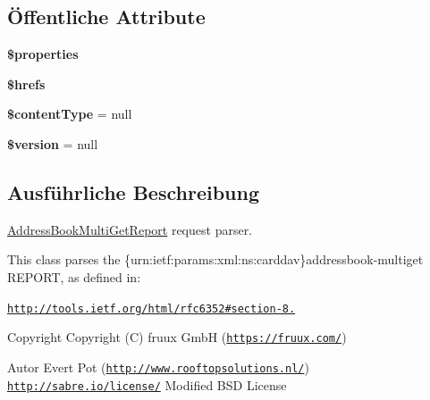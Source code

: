\subsection*{Öffentliche Attribute}
\begin{DoxyCompactItemize}
\item 
\mbox{\label{class_sabre_1_1_card_d_a_v_1_1_xml_1_1_request_1_1_address_book_multi_get_report_a31ad31eafb56d7f2ff9d80988c9223bd}} 
{\bfseries \$properties}
\item 
\mbox{\label{class_sabre_1_1_card_d_a_v_1_1_xml_1_1_request_1_1_address_book_multi_get_report_a7df3fb87cdb00eeb3ca7a12209048f5b}} 
{\bfseries \$hrefs}
\item 
\mbox{\label{class_sabre_1_1_card_d_a_v_1_1_xml_1_1_request_1_1_address_book_multi_get_report_a682172bd4be788625c969f51a0ba1e2f}} 
{\bfseries \$content\+Type} = null
\item 
\mbox{\label{class_sabre_1_1_card_d_a_v_1_1_xml_1_1_request_1_1_address_book_multi_get_report_a423a15cad84610af86f9421c030320ab}} 
{\bfseries \$version} = null
\end{DoxyCompactItemize}


\subsection{Ausführliche Beschreibung}
\mbox{\hyperlink{class_sabre_1_1_card_d_a_v_1_1_xml_1_1_request_1_1_address_book_multi_get_report}{Address\+Book\+Multi\+Get\+Report}} request parser.

This class parses the \{urn\+:ietf\+:params\+:xml\+:ns\+:carddav\}addressbook-\/multiget R\+E\+P\+O\+RT, as defined in\+:

\href{http://tools.ietf.org/html/rfc6352#section-8.7}{\tt http\+://tools.\+ietf.\+org/html/rfc6352\#section-\/8.}

\begin{DoxyCopyright}{Copyright}
Copyright (C) fruux GmbH (\href{https://fruux.com/}{\tt https\+://fruux.\+com/}) 
\end{DoxyCopyright}
\begin{DoxyAuthor}{Autor}
Evert Pot (\href{http://www.rooftopsolutions.nl/}{\tt http\+://www.\+rooftopsolutions.\+nl/})  \href{http://sabre.io/license/}{\tt http\+://sabre.\+io/license/} Modified B\+SD License 
\end{DoxyAuthor}


